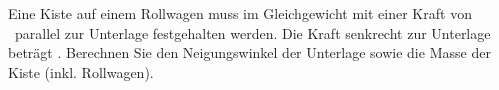 Eine Kiste auf einem Rollwagen muss im Gleichgewicht mit einer Kraft von \FPaO\ parallel zur Unterlage festgehalten werden. Die Kraft senkrecht zur Unterlage beträgt \FSkO. Berechnen Sie den Neigungswinkel der Unterlage sowie die Masse der Kiste (inkl. Rollwagen).
